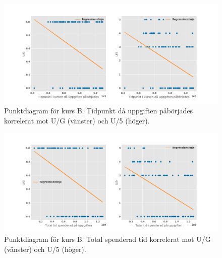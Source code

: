 \begin{figure}[hbtp]
    \centering
    \includegraphics[width=1\textwidth]{images/pktdiagram/vektEg2.png}
    \caption{Punktdiagram för kurs B. Tidpunkt då uppgiften påbörjades korrelerat mot U/G (vänster) och U/5 (höger).}
    \label{fig:pktdigB2}
\end{figure}

\begin{figure}[hbtp]
    \centering
    \includegraphics[width=1\textwidth]{images/pktdiagram/vektEg4.png}
    \caption{Punktdiagram för kurs B. Total spenderad tid korrelerat mot U/G (vänster) och U/5 (höger).}
    \label{fig:pktdigB3}
\end{figure}

